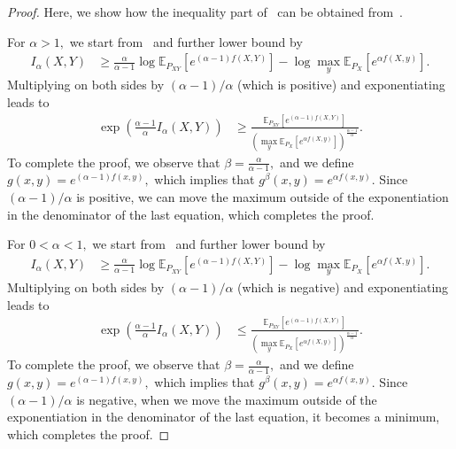 \documentclass{article}
\numberwithin{theorem}{section}
\numberwithin{example}{section}
\numberwithin{remark}{section}
\numberwithin{definition}{section}
\newcommand{\E}{\mathbb{E}}
\begin{document}
\begin{proof}
Here, we show how the inequality part of~ can be obtained from~.

For $\alpha>1,$ we start from~ and further lower bound by
 \begin{align}
    I_\alpha(X,Y) &\ge  \frac{\alpha}{\alpha-1} \log \E_{P_{XY}}\left[e^{(\alpha-1)f(X,Y)}\right] -  \log \max_y \E_{P_X}\left[e^{\alpha f(X,y)}\right] .
\end{align}
Multiplying on both sides by $(\alpha-1)/\alpha$ (which is positive) and exponentiating leads to
 \begin{align}
    \exp\left( \frac{\alpha-1}{\alpha} I_\alpha(X,Y) \right) &\ge  \frac{ \E_{P_{XY}}\left[e^{(\alpha-1)f(X,Y)}\right] }{  \left( \max_y \E_{P_X}\left[e^{\alpha f(X,y)}\right] \right)^{\frac{\alpha-1}{\alpha}}}.
\end{align}
To complete the proof, we observe that $\beta = \frac{\alpha}{\alpha-1},$ and we define $g(x,y) = e^{(\alpha-1)f(x,y)},$ which implies that $g^\beta(x,y) = e^{\alpha f(x,y)}.$ Since $(\alpha-1)/\alpha$ is positive, we can move the maximum outside of the exponentiation in the denominator of the last equation, which completes the proof.

For $0 < \alpha < 1,$ we start from~ and further lower bound by
\begin{align}
  I_\alpha(X,Y) &\ge \frac{\alpha}{\alpha-1} \log \E_{P_{XY}}\left[e^{(\alpha-1) f(X,Y)}\right] -  \log \max_y \E_{P_X}\left[e^{\alpha f(X,y)}\right] .
\end{align}
Multiplying on both sides by $(\alpha-1)/\alpha$ (which is negative) and exponentiating leads to
\begin{align}
  \exp\left( \frac{\alpha-1}{\alpha} I_\alpha(X,Y) \right) &\le \frac{ \E_{P_{XY}}\left[e^{(\alpha-1) f(X,Y)}\right]  }{ \left( \max_y \E_{P_X}\left[e^{\alpha f(X,y)}\right] \right)^{\frac{\alpha-1}{\alpha}} }.
\end{align}
To complete the proof, we observe that $\beta = \frac{\alpha}{\alpha-1},$ and we define $g(x,y) = e^{(\alpha-1)f(x,y)},$ which implies that $g^\beta(x,y) = e^{\alpha f(x,y)}.$ Since $(\alpha-1)/\alpha$ is negative, when we move the maximum outside of the exponentiation in the denominator of the last equation, it becomes a minimum, which completes the proof.
\end{proof}
\end{document}
